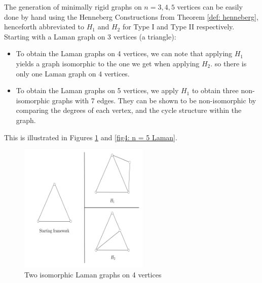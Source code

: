 \begin{flushleft}
The generation of minimally rigid graphs on $n = 3,4,5$ vertices can be easily done by hand using the Henneberg Constructions from Theorem \ref{def: henneberg}, henceforth abbreviated to $H_1$ and $H_2$ for Type I and Type II respectively. Starting with a Laman graph on 3 vertices (a triangle):
\begin{itemize}
    \item To obtain the Laman graphs on 4 vertices, we can note that applying $H_1$ yields a graph isomorphic to the one we get when applying $H_2$. so there is only one Laman graph on $4$ vertices. 
    \item To obtain the Laman graphs on 5 vertices, we apply $H_1$ to obtain three non-isomorphic graphs with 7 edges. They can be shown to be non-isomorphic by comparing the degrees of each vertex, and the cycle structure within the graph.
\end{itemize}

\noindent
This is illustrated in Figures \ref{fig4: n = 4 Laman} and \ref{fig4: n = 5 Laman}.
\end{flushleft}
\vspace{-4mm}
\begin{figure}[htbp]
    \centering
    \includegraphics[width = 0.55\textwidth]{Chapter 4/3. n=4.png}
    \caption{Two isomorphic Laman graphs on 4 vertices}
    \label{fig4: n = 4 Laman}
\end{figure}

